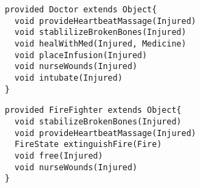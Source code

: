 \begin{lstlisting}[style = dsl, caption = Deklaration von Doctor, captionpos = b, label = lst_doctor]
provided Doctor extends Object{
  void provideHeartbeatMassage(Injured)
  void stablilizeBrokenBones(Injured)
  void healWithMed(Injured, Medicine)
  void placeInfusion(Injured)
  void nurseWounds(Injured)
  void intubate(Injured)
}
\end{lstlisting}
\begin{lstlisting}[style = dsl, caption = Deklaration von FireFighter, captionpos = b, label = lst_firefighter]
provided FireFighter extends Object{
  void stabilizeBrokenBones(Injured)
  void provideHeartbeatMassage(Injured)
  FireState extinguishFire(Fire)
  void free(Injured)
  void nurseWounds(Injured)
}
\end{lstlisting}